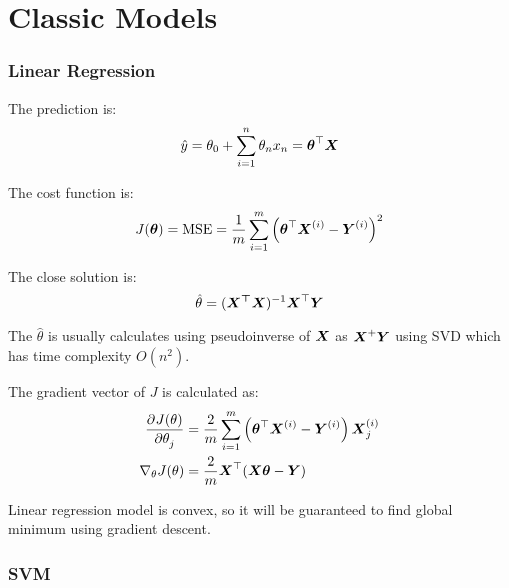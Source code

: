 
\chapter{Classic Models}



\subsection{Linear Regression}

The prediction is:
\begin{equation}
    \hat{y} = \theta_0 + \sum_{i=1}^n \theta_n x_n = \boldsymbol{\theta}^\top \boldsymbol{X}
\end{equation}

The cost function is:
\begin{equation}
    J(\boldsymbol{\theta} ) = \text{MSE} = \frac{1}{m} \sum_{i=1}^m \left(\boldsymbol{\theta}^\top  \boldsymbol{X}^{(i)} - \boldsymbol{Y}^{(i)} \right)^2
\end{equation}

The close solution is:
\begin{equation}
    \hat{\theta} = (\boldsymbol{{X}^\top \boldsymbol{X}} )^{-1} \boldsymbol{X}^\top \boldsymbol{Y}
\end{equation}

The $\hat{\theta}$ is usually calculates using pseudoinverse of $\boldsymbol{X}$ as $\boldsymbol{{X}}^{+} \boldsymbol{Y}$ using SVD which has time complexity $O(n^2)$. 


The gradient vector of $J$ is calculated as:
\begin{equation}
    \begin{aligned}
    \dpd{J(\theta)}{\theta_j} &= \frac{2}{m} \sum_{i=1}^m \left( \columnvector{\theta}^\top \subscription{X}{i} - \subscription{Y}{i} \right) \subscription{X}{i}_j \\
    \nabla_\theta J(\theta) &= \frac{2}{m} \columnvector{X}^\top (\columnvector{X} \columnvector{\theta} - \columnvector{Y} )
    \end{aligned}
\end{equation}



Linear regression model is convex, so it will be guaranteed to find global minimum using gradient descent.



\subsection{SVM}

